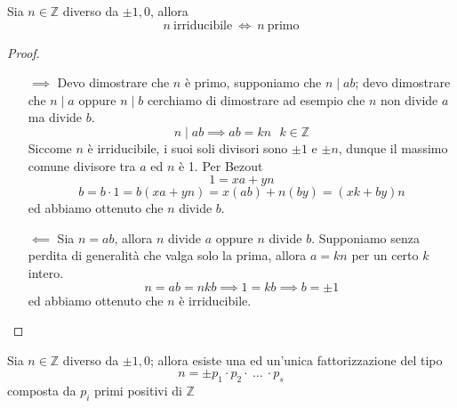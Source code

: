 \begin{teorema}
	Sia $n \in \mathbb{Z}$ diverso da $\pm 1,0$, allora
	\begin{equation*}
	n \ \text{irriducibile} \ \iff \ n \ \text{primo}
	\end{equation*}
\end{teorema}
\begin{proof}\
	\begin{itemize}
		\item[$\implies$] Devo dimostrare che $n$ è primo, supponiamo che $n\mid ab$; devo dimostrare che $n\mid a$ oppure $n\mid b$ cerchiamo di dimostrare ad esempio che $n$ non divide $a$ ma divide $b$.
		\begin{equation*}
		n\mid ab \implies ab=kn \ \ \ k \in \mathbb{Z}
		\end{equation*}
		Siccome $n$ è irriducibile, i suoi soli divisori sono $\pm 1$ e $\pm n$, dunque il massimo comune divisore tra $a$ ed $n$ è 1. Per Bezout 
		\begin{equation*}
		1=xa+yn
		\end{equation*}
		\begin{equation*}
		b=b\cdot1=b(xa+yn)=x(ab)+n(by)=(xk+by)n
		\end{equation*}
		ed abbiamo ottenuto che $n$ divide $b$.
		\item[$\impliedby$] Sia $n=ab$, allora $n$ divide $a$ oppure $n$ divide $b$. Supponiamo senza perdita di generalità che valga solo la prima, allora $a=kn$ per un certo $k$ intero.
		\begin{equation*}
		n = ab = nkb \implies 1 = kb \implies b = \pm 1
		\end{equation*}
		ed abbiamo ottenuto che $n$ è irriducibile.
	\end{itemize}
\end{proof}
\begin{teorema} 
	Sia $n \in \mathbb{Z}$ diverso da $\pm 1,0$; allora esiste una ed un'unica fattorizzazione del tipo
	\begin{equation*}
	n = \pm p_1\cdot p_2 \cdot \ \dots\ \cdot p_s
	\end{equation*}
	composta da $p_i$ primi positivi di $\mathbb{Z}$
\end{teorema}
